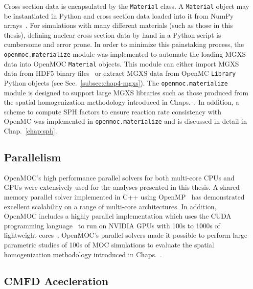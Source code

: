 Cross section data is encapsulated by the \texttt{Material} class. A \texttt{Material} object may be instantiated in Python and cross section data loaded into it from NumPy arrays~\cite{walt2011numpy}. For simulations with many different materials (such as those in this thesis), defining nuclear cross section data by hand in a Python script is cumbersome and error prone. In order to minimize this painstaking process, the \texttt{openmoc.materialize} module was implemented to automate the loading \ac{MGXS} data into OpenMOC \texttt{Material} objects. This module can either import \ac{MGXS} data from HDF5 binary files~\cite{koranne2011hdf5} or extract \ac{MGXS} data from OpenMC \texttt{Library} Python objects (see Sec.~\ref{subsec:chap4-mgxs}). The \texttt{openmoc.materialize} module is designed to support large \ac{MGXS} libraries such as those produced from the spatial homogenization methodology introduced in Chaps.~. In addition, a scheme to compute \ac{SPH} factors to ensure reaction rate consistency with OpenMC was implemented in \texttt{openmoc.materialize} and is discussed in detail in Chap.~\ref{chap:sph}.

\subsection{Parallelism}
\label{subsubsec:chap4-openmoc-parallel}

OpenMOC's high performance parallel solvers for both multi-core \ac{CPU}s and \ac{GPU}s were extensively used for the analyses presented in this thesis. A shared memory parallel solver implemented in C++ using OpenMP~\cite{openmp2013} has demonstrated excellent scalability on a range of multi-core architectures\cite{boyd2016parallel}. In addition, OpenMOC includes a highly parallel implementation which uses the CUDA programming language~\cite{nvidia2012cuda} to run on NVIDIA \ac{GPU}s with 100s to 1000s of lightweight cores~\cite{boyd2013massively}. OpenMOC's parallel solvers made it possible to perform large parametric studies of 100s of \ac{MOC} simulations to evaluate the spatial homogenization methodology introduced in Chaps.~.


\subsection{CMFD Acecleration}
\label{subsubsec:chap4-openmoc-cmfd}

